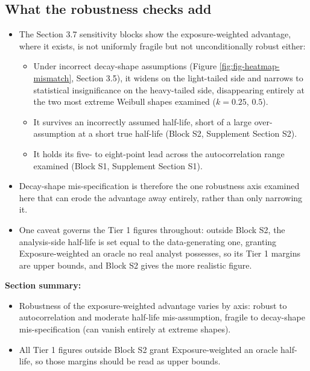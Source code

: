 \documentclass[
  11pt,
]{article}
\providecommand{\tightlist}{%
  \setlength{\itemsep}{0pt}\setlength{\parskip}{0pt}}
\begin{document}
\subsection{What the robustness checks add}\label{what-the-robustness-checks-add}

\begin{itemize}
\tightlist
\item
  The Section 3.7 sensitivity blocks show the exposure-weighted
  advantage, where it exists, is not uniformly fragile but not
  unconditionally robust either:

  \begin{itemize}
  \tightlist
  \item
    Under incorrect decay-shape assumptions (Figure
    \ref{fig:fig-heatmap-mismatch}, Section 3.5), it widens on the
    light-tailed side and narrows to statistical insignificance on
    the heavy-tailed side, disappearing entirely at the two most
    extreme Weibull shapes examined (\(k=0.25\), \(0.5\)).
  \item
    It survives an incorrectly assumed half-life, short of a large
    over-assumption at a short true half-life (Block S2, Supplement
    Section S2).
  \item
    It holds its five- to eight-point lead across the autocorrelation
    range examined (Block S1, Supplement Section S1).
  \end{itemize}
\item
  Decay-shape mis-specification is therefore the one robustness axis
  examined here that can erode the advantage away entirely, rather
  than only narrowing it.
\item
  One caveat governs the Tier 1 figures throughout: outside Block S2,
  the analysis-side half-life is set equal to the data-generating
  one, granting Exposure-weighted an oracle no real analyst
  possesses, so its Tier 1 margins are upper bounds, and Block S2
  gives the more realistic figure.
\end{itemize}

\textbf{Section summary:}

\begin{itemize}
\tightlist
\item
  Robustness of the exposure-weighted advantage varies by axis:
  robust to autocorrelation and moderate half-life mis-assumption,
  fragile to decay-shape mis-specification (can vanish entirely at
  extreme shapes).
\item
  All Tier 1 figures outside Block S2 grant Exposure-weighted an
  oracle half-life, so those margins should be read as upper bounds.
\end{itemize}
\end{document}
